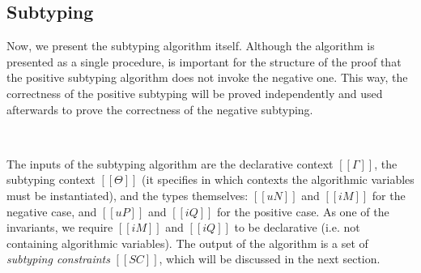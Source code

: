 \documentclass[acmsmall,natbib=false,review,anonymous]{acmart}
\begin{document}
\subsection{Subtyping}
\label{sec:subtyping}

Now, we present the subtyping algorithm itself.
Although the algorithm is presented as a single procedure,
is important for the structure of the proof that the positive subtyping algorithm
does not invoke the negative one. This way, the correctness of the positive 
subtyping will be proved independently and used afterwards to prove the
correctness of the negative subtyping.


\begin{algorithm}[Subtyping]
  \label{alg:subtyping}
  \hfill\\
  \ottdefnANsubLabeled{}
  \ottdefnAPsupLabeled{}
\end{algorithm}

The inputs of the subtyping algorithm are the declarative context $[[Γ]]$,
the subtyping context $[[Θ]]$ (it specifies in which contexts the algorithmic variables
must be instantiated), and the types themselves: $[[uN]]$ and $[[iM]]$ for the negative case,
and $[[uP]]$ and $[[iQ]]$ for the positive case. 
As one of the invariants, we require
$[[iM]]$ and $[[iQ]]$ to be declarative (i.e. not containing algorithmic variables).
The output of the algorithm is a set of \emph{subtyping constraints} $[[SC]]$,
which will be discussed in the next section.
\end{document}
